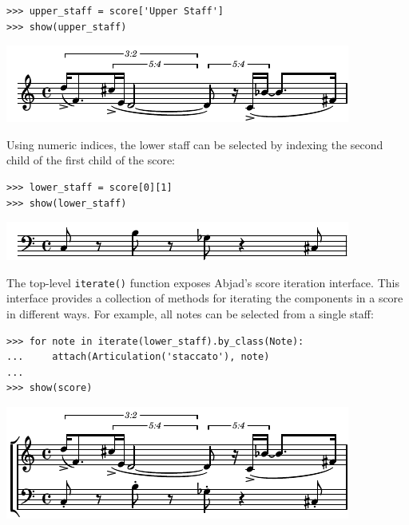 \documentclass{article}
\begin{document}
\begin{lstlisting}
>>> upper_staff = score['Upper Staff']
>>> show(upper_staff)
\end{lstlisting}
\includegraphics{assets/lilypond-dcce2b5927dd4f606034c3efcde7da2e.pdf}

\noindent Using numeric indices, the lower staff can be selected by indexing
the second child of the first child of the score:

\begin{lstlisting}
>>> lower_staff = score[0][1]
>>> show(lower_staff)
\end{lstlisting}
\includegraphics{assets/lilypond-fa746e527d218a814e36af2f46d314bb.pdf}

\noindent The top-level \texttt{iterate()} function exposes Abjad's score
iteration interface. This interface provides a collection of methods for
iterating the components in a score in different ways. For example, all
notes can be selected from a single staff:

\begin{lstlisting}
>>> for note in iterate(lower_staff).by_class(Note):
...     attach(Articulation('staccato'), note)
...
>>> show(score)
\end{lstlisting}
\includegraphics{assets/lilypond-b7a01ad584c3c470c0bbff20fbc76741.pdf}
\end{document}
